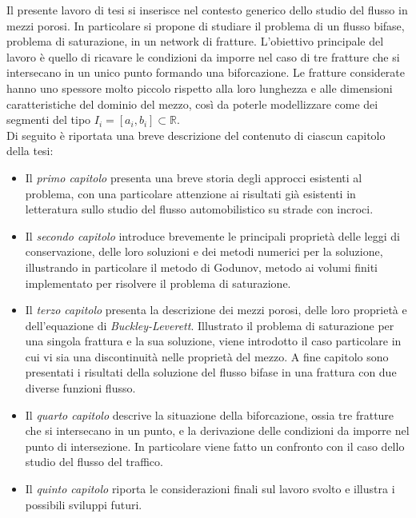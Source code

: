 \par \noindent Il presente lavoro di tesi si inserisce nel contesto generico dello studio del flusso in mezzi porosi. In particolare si propone di studiare il problema di un flusso bifase, problema di saturazione, in un network di fratture. L'obiettivo principale del lavoro è quello di ricavare le condizioni da imporre nel caso di tre fratture che si intersecano in un unico punto formando una biforcazione. Le fratture considerate hanno uno spessore molto piccolo rispetto alla loro lunghezza e alle dimensioni caratteristiche del dominio del mezzo, così da poterle  modellizzare come dei segmenti del tipo $I_i=[a_i, b_i] \subset \mathbb{R}$.\\

Di seguito è riportata una breve descrizione del contenuto di ciascun capitolo della tesi:
\begin{itemize}
\item Il \textit{primo capitolo} presenta una breve storia degli approcci esistenti al problema, con una particolare attenzione ai risultati già esistenti in letteratura sullo studio del flusso automobilistico su strade con incroci.
\item Il \textit{secondo capitolo} introduce brevemente le principali proprietà delle leggi di conservazione, delle loro soluzioni e dei metodi numerici per la soluzione, illustrando in particolare il metodo di Godunov, metodo ai volumi finiti implementato per risolvere il problema di saturazione.
\item Il \textit{terzo capitolo} presenta la descrizione dei mezzi porosi, delle loro proprietà e dell'equazione di \textit{Buckley-Leverett}. Illustrato il problema di saturazione per una singola frattura e la sua soluzione, viene introdotto il caso particolare in cui vi sia una discontinuità nelle proprietà del mezzo. A fine capitolo sono presentati i risultati della soluzione del flusso bifase in una frattura con due diverse funzioni flusso. 
\item Il \textit{quarto capitolo} descrive la situazione della biforcazione, ossia tre fratture che si intersecano in un punto, e la derivazione delle condizioni da imporre nel punto di intersezione. In particolare viene fatto un confronto con il caso dello studio del flusso del traffico.
\item Il \textit{quinto capitolo} riporta le considerazioni finali sul lavoro svolto e illustra i possibili sviluppi futuri.
\end{itemize}

